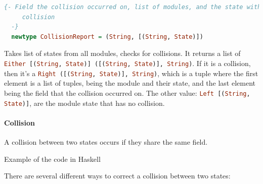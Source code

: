 
\begin{lstlisting}[language=Haskell]
  {- Field the collision occurred on, list of modules, and the state with the
     collision
  -}
  newtype CollisionReport = (String, [(String, State)])
\end{lstlisting}

Takes list of states from all modules, checks for collisions. It returns a
list of \lstinline[language=Haskell]{Either [(String, State)] ([(String, State)], String)}. If it is a
collision, then it's a \lstinline[language=Haskell]{Right ([(String, State)], String)}, which is a tuple
where the first element is a list of tuples, being the module and their
state, and the last element being the field that the collision occurred on.
The other value: \lstinline[language=Haskell]{Left [(String, State)]}, are the module state that has no
collision.

\paragraph{Collision} A collision between two states occurs if they share the same
field.

Example of the code in Haskell

\begin{center}
  
\end{center}

There are several different ways to correct a collision between two
states:

